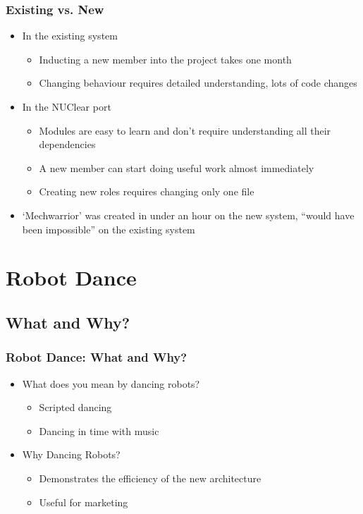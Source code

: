 \documentclass{beamer}
\begin{document}
\begin{frame}
	\frametitle{Existing vs. New}
	
	\begin{itemize}
		\item In the existing system
		\begin{itemize}
			\item Inducting a new member into the project takes one month
			\item Changing behaviour requires detailed understanding, lots of code changes
		\end{itemize}
		\item In the NUClear port
		\begin{itemize}
			\item Modules are easy to learn and don't require understanding all their dependencies
			\item A new member can start doing useful work almost immediately
			\item Creating new roles requires changing only one file
		\end{itemize}
		\item `Mechwarrior' was created in under an hour on the new system, ``would have been impossible'' on the existing system
	\end{itemize}
\end{frame}


\section{Robot Dance}
	\begin{frame}
		\sectionpage %
	\end{frame}
	\subsection{What and Why?} %
	\begin{frame}
		\frametitle{Robot Dance: What and Why?}
		\begin{itemize}
			\item What does you mean by dancing robots?
			\begin{itemize}
				\item Scripted dancing
				\item Dancing in time with music
			\end{itemize}
			\item Why Dancing Robots?
			\begin{itemize}
				\item Demonstrates the efficiency of the new architecture
				\item Useful for marketing
			\end{itemize}
		\end{itemize}
	\end{frame}
\end{document}
